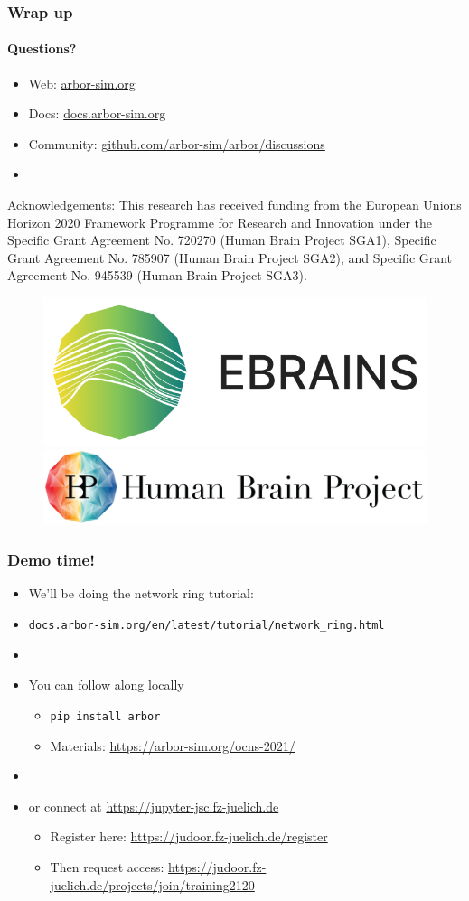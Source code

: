 \documentclass[t]{beamer}
\begin{document}
\begin{frame}
    \frametitle{Wrap up}
    \framesubtitle{Questions?}
    \begin{itemize}
        \item Web: \url{arbor-sim.org}
        \item Docs: \url{docs.arbor-sim.org}
        \item Community: \url{github.com/arbor-sim/arbor/discussions}
        \item[]
    \end{itemize}

    { \scriptsize Acknowledgements: This research has received funding from the European Unions
    Horizon 2020 Framework Programme for Research and
    Innovation under the Specific Grant Agreement No. 720270
    (Human Brain Project SGA1), Specific Grant Agreement No.
    785907 (Human Brain Project SGA2), and Specific Grant
    Agreement No. 945539 (Human Brain Project SGA3). }
    \newline
    \begin{figure}[h]
        \begin{center}
            \includegraphics[width=0.2\linewidth]{ebrains_logo.png}
            \hspace{2em}
            \includegraphics[width=0.4\linewidth]{HBP_logo.jpg}
        \end{center}
    \end{figure}
\end{frame}

\begin{frame}
    \frametitle{Demo time!}
    \begin{itemize}
    \item We'll be doing the network ring tutorial:
    \item[] \texttt{docs.arbor-sim.org/en/latest/tutorial/network\_ring.html}
    \item[]
    \item You can follow along locally
        \begin{itemize}
        \item \texttt{pip install arbor}
        \item Materials: \url{https://arbor-sim.org/ocns-2021/}
        \end{itemize}
    \item[]
    \item or connect at \url{https://jupyter-jsc.fz-juelich.de}
        \begin{itemize}
        \item Register here: \url{https://judoor.fz-juelich.de/register}
        \item Then request access: \url{https://judoor.fz-juelich.de/projects/join/training2120}
        \end{itemize}
    \end{itemize}
\end{frame}
\end{document}
